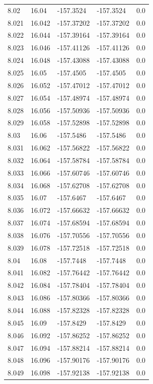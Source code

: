 \begin{tabular}{lllll}
8.02 & 16.04 & -157.3524 & -157.3524 & 0.0 \\
8.021 & 16.042 & -157.37202 & -157.37202 & 0.0 \\
8.022 & 16.044 & -157.39164 & -157.39164 & 0.0 \\
8.023 & 16.046 & -157.41126 & -157.41126 & 0.0 \\
8.024 & 16.048 & -157.43088 & -157.43088 & 0.0 \\
8.025 & 16.05 & -157.4505 & -157.4505 & 0.0 \\
8.026 & 16.052 & -157.47012 & -157.47012 & 0.0 \\
8.027 & 16.054 & -157.48974 & -157.48974 & 0.0 \\
8.028 & 16.056 & -157.50936 & -157.50936 & 0.0 \\
8.029 & 16.058 & -157.52898 & -157.52898 & 0.0 \\
8.03 & 16.06 & -157.5486 & -157.5486 & 0.0 \\
8.031 & 16.062 & -157.56822 & -157.56822 & 0.0 \\
8.032 & 16.064 & -157.58784 & -157.58784 & 0.0 \\
8.033 & 16.066 & -157.60746 & -157.60746 & 0.0 \\
8.034 & 16.068 & -157.62708 & -157.62708 & 0.0 \\
8.035 & 16.07 & -157.6467 & -157.6467 & 0.0 \\
8.036 & 16.072 & -157.66632 & -157.66632 & 0.0 \\
8.037 & 16.074 & -157.68594 & -157.68594 & 0.0 \\
8.038 & 16.076 & -157.70556 & -157.70556 & 0.0 \\
8.039 & 16.078 & -157.72518 & -157.72518 & 0.0 \\
8.04 & 16.08 & -157.7448 & -157.7448 & 0.0 \\
8.041 & 16.082 & -157.76442 & -157.76442 & 0.0 \\
8.042 & 16.084 & -157.78404 & -157.78404 & 0.0 \\
8.043 & 16.086 & -157.80366 & -157.80366 & 0.0 \\
8.044 & 16.088 & -157.82328 & -157.82328 & 0.0 \\
8.045 & 16.09 & -157.8429 & -157.8429 & 0.0 \\
8.046 & 16.092 & -157.86252 & -157.86252 & 0.0 \\
8.047 & 16.094 & -157.88214 & -157.88214 & 0.0 \\
8.048 & 16.096 & -157.90176 & -157.90176 & 0.0 \\
8.049 & 16.098 & -157.92138 & -157.92138 & 0.0 \\

\end{tabular}
